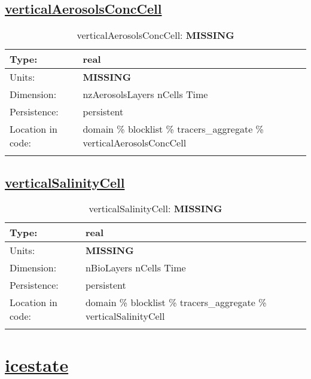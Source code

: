 \subsection[verticalAerosolsConcCell]{\hyperref[sec:var_tab_tracers_aggregate]{verticalAerosolsConcCell}}
\label{subsec:var_sec_tracers_aggregate_verticalAerosolsConcCell}
\begin{center}
\begin{longtable}{| p{2.0in} | p{4.0in} |}
        \hline 
        Type: & real \\
        \hline 
        Units: & {\bf \color{red} MISSING} \\
        \hline 
        Dimension: & nzAerosolsLayers nCells Time \\
        \hline 
        Persistence: & persistent \\
        \hline 
         Location in code: & domain \% blocklist \% tracers\_aggregate \% verticalAerosolsConcCell \\
         \hline 
    \caption{verticalAerosolsConcCell: {\bf \color{red} MISSING}}
\end{longtable}
\end{center}
\subsection[verticalSalinityCell]{\hyperref[sec:var_tab_tracers_aggregate]{verticalSalinityCell}}
\label{subsec:var_sec_tracers_aggregate_verticalSalinityCell}
\begin{center}
\begin{longtable}{| p{2.0in} | p{4.0in} |}
        \hline 
        Type: & real \\
        \hline 
        Units: & {\bf \color{red} MISSING} \\
        \hline 
        Dimension: & nBioLayers nCells Time \\
        \hline 
        Persistence: & persistent \\
        \hline 
         Location in code: & domain \% blocklist \% tracers\_aggregate \% verticalSalinityCell \\
         \hline 
    \caption{verticalSalinityCell: {\bf \color{red} MISSING}}
\end{longtable}
\end{center}
\section[icestate]{\hyperref[sec:var_tab_icestate]{icestate}}
\label{sec:var_sec_icestate}
